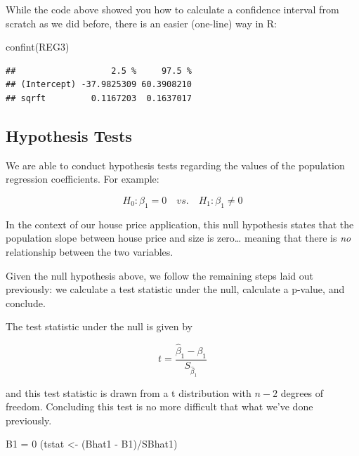 \documentclass[
]{book}
\newenvironment{Shaded}{\begin{snugshade}}{\end{snugshade}}
\newcommand{\DecValTok}[1]{\textcolor[rgb]{0.00,0.00,0.81}{#1}}
\newcommand{\FunctionTok}[1]{\textcolor[rgb]{0.00,0.00,0.00}{#1}}
\newcommand{\NormalTok}[1]{#1}
\newcommand{\OtherTok}[1]{\textcolor[rgb]{0.56,0.35,0.01}{#1}}
\newcommand{\SpecialCharTok}[1]{\textcolor[rgb]{0.00,0.00,0.00}{#1}}
\begin{document}
While the code above showed you how to calculate a confidence interval from scratch as we did before, there is an easier (one-line) way in R:

\begin{Shaded}
\begin{Highlighting}[]
\FunctionTok{confint}\NormalTok{(REG3)}
\end{Highlighting}
\end{Shaded}

\begin{verbatim}
##                   2.5 %     97.5 %
## (Intercept) -37.9825309 60.3908210
## sqrft         0.1167203  0.1637017
\end{verbatim}

\hypertarget{hypothesis-tests}{%
\subsection{Hypothesis Tests}\label{hypothesis-tests}}

We are able to conduct hypothesis tests regarding the values of the population regression coefficients. For example:

\[H_0:\beta_1 = 0 \quad vs. \quad H_1:\beta_1 \neq 0\]

In the context of our house price application, this null hypothesis states that the population slope between house price and size is zero\ldots{} meaning that there is \emph{no} relationship between the two variables.

Given the null hypothesis above, we follow the remaining steps laid out previously: we calculate a test statistic under the null, calculate a p-value, and conclude.

The test statistic under the null is given by

\[t=\frac{\hat{\beta}_1 - \beta_1}{S_{\hat{\beta}_1}}\]

and this test statistic is drawn from a t distribution with \(n-2\) degrees of freedom. Concluding this test is no more difficult that what we've done previously.

\begin{Shaded}
\begin{Highlighting}[]
\NormalTok{B1 }\OtherTok{=} \DecValTok{0}
\NormalTok{(tstat }\OtherTok{\textless{}{-}}\NormalTok{ (Bhat1 }\SpecialCharTok{{-}}\NormalTok{ B1)}\SpecialCharTok{/}\NormalTok{SBhat1)}
\end{Highlighting}
\end{Shaded}
\end{document}
